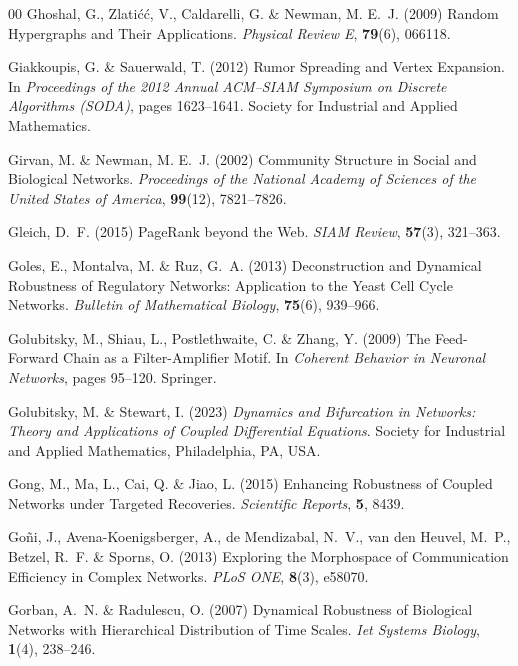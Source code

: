 \documentclass{comnet-mod}
\begin{document}
\begin{thebibliography}{00}
Ghoshal, G., Zlati{\'c}{\'c}, V., Caldarelli, G. {\&} Newman, M. E.~J. (2009)
  {Random Hypergraphs and Their Applications}. {\em {Physical Review E}},
  \textbf{79}(6), 066118.

Giakkoupis, G. {\&} Sauerwald, T. (2012)  {Rumor {{Spreading}} and {{Vertex
  Expansion}}}. In {\em {Proceedings of the 2012 {{Annual ACM--SIAM Symposium}}
  on {{Discrete Algorithms}} ({{SODA}})}}, pages 1623--1641. {Society for
  Industrial and Applied Mathematics}.

Girvan, M. {\&} Newman, M. E.~J. (2002)  Community Structure in Social and
  Biological Networks. {\em Proceedings of the National Academy of Sciences of
  the United States of America}, \textbf{99}(12), 7821--7826.

Gleich, D.~F. (2015)  {{{PageRank}} beyond the {W}eb}. {\em {SIAM Review}},
  \textbf{57}(3), 321--363.

Goles, E., Montalva, M. {\&} Ruz, G.~A. (2013)  {Deconstruction and Dynamical
  Robustness of Regulatory Networks: {{Application}} to the Yeast Cell Cycle
  Networks}. {\em {Bulletin of Mathematical Biology}}, \textbf{75}(6),
  939--966.

Golubitsky, M., Shiau, L., Postlethwaite, C. {\&} Zhang, Y. (2009)  {The
  Feed-Forward Chain as a Filter-Amplifier Motif}. In {\em {Coherent Behavior
  in Neuronal Networks}}, pages 95--120. {Springer}.

Golubitsky, M. {\&} Stewart, I. (2023) {\em {Dynamics and Bifurcation in
  Networks: Theory and Applications of Coupled Differential Equations}}.
Society for Industrial and Applied Mathematics, Philadelphia, PA, USA.

Gong, M., Ma, L., Cai, Q. {\&} Jiao, L. (2015)  {Enhancing Robustness of
  Coupled Networks under Targeted Recoveries}. {\em {Scientific Reports}},
  \textbf{5}, 8439.

Go{\~n}i, J., {Avena-Koenigsberger}, A., {de Mendizabal}, N.~V., {van den
  Heuvel}, M.~P., Betzel, R.~F. {\&} Sporns, O. (2013)  {Exploring the
  Morphospace of Communication Efficiency in Complex Networks}. {\em {PLoS
  ONE}}, \textbf{8}(3), e58070.

Gorban, A.~N. {\&} Radulescu, O. (2007)  {Dynamical Robustness of Biological
  Networks with Hierarchical Distribution of Time Scales}. {\em {Iet Systems
  Biology}}, \textbf{1}(4), 238--246.


\end{thebibliography}
\end{document}
